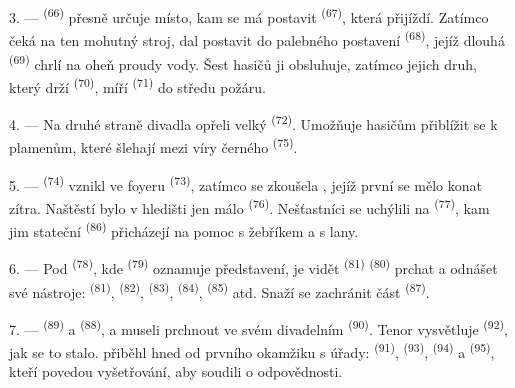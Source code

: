 3. ---  \textsuperscript{(66)} přesně určuje místo, kam se má postavit
 \textsuperscript{(67)}, která přijíždí. Zatímco čeká na ten mohutný
stroj, dal postavit do palebného postavení  \textsuperscript{(68)},
jejíž dlouhá  \textsuperscript{(69)} chrlí na oheň proudy vody. Šest hasičů ji
obsluhuje, zatímco jejich druh, který drží
 \textsuperscript{(70)}, míří 
\textsuperscript{(71)} do středu požáru.

4. --- Na druhé straně divadla opřeli velký  \textsuperscript{(72)}. Umožňuje
hasičům přiblížit se k plamenům, které šlehají mezi víry černého
\textsuperscript{(75)}.

\VUsaut{5.0mm}
\VUsaut{3.4mm}

5. ---  \textsuperscript{(74)} vznikl ve foyeru 
\textsuperscript{(73)}, zatímco se zkoušela , jejíž první
 se mělo konat zítra. Naštěstí bylo v hledišti jen málo
 \textsuperscript{(76)}. Nešťastníci se uchýlili na 
\textsuperscript{(77)}, kam jim stateční  \textsuperscript{(86)} přicházejí na
pomoc s žebříkem a s lany.

6. --- Pod  \textsuperscript{(78)}, kde 
\textsuperscript{(79)} oznamuje představení, je vidět 
\textsuperscript{(81)}  \textsuperscript{(80)} prchat a odnášet své
nástroje:  \textsuperscript{(81)},  \textsuperscript{(82)},
 \textsuperscript{(83)},
 \textsuperscript{(84)},  \textsuperscript{(85)} atd.
Snaží se zachránit část  \textsuperscript{(87)}.

7. ---  \textsuperscript{(89)} a  \textsuperscript{(88)},
 a  museli prchnout ve svém divadelním 
\textsuperscript{(90)}. Tenor vysvětluje
 \textsuperscript{(92)}, jak se to stalo.  přiběhl
hned od prvního okamžiku s úřady:  \textsuperscript{(91)},
 \textsuperscript{(93)}, 
\textsuperscript{(94)} a  \textsuperscript{(95)}, kteří povedou
vyšetřování, aby soudili o odpovědnosti.
